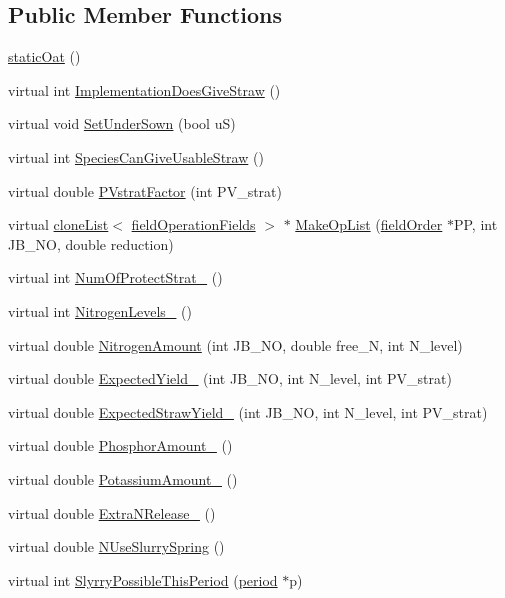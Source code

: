 \subsection*{Public Member Functions}
\begin{DoxyCompactItemize}
\item 
\hyperlink{classstatic_oat_afcf04a462cdd16c42cc6aad49eb2b06e}{staticOat} ()
\item 
virtual int \hyperlink{classstatic_oat_a75f86a415aa54352870606818273fd94}{ImplementationDoesGiveStraw} ()
\item 
virtual void \hyperlink{classstatic_oat_a6f91239da2b953258084806375b60516}{SetUnderSown} (bool uS)
\item 
virtual int \hyperlink{classstatic_oat_ab66ee7686d5a79a84ad38d01652910ac}{SpeciesCanGiveUsableStraw} ()
\item 
virtual double \hyperlink{classstatic_oat_af4d6207a79cfdb61327d060e5045078e}{PVstratFactor} (int PV\_\-strat)
\item 
virtual \hyperlink{classclone_list}{cloneList}$<$ \hyperlink{classfield_operation_fields}{fieldOperationFields} $>$ $\ast$ \hyperlink{classstatic_oat_a974ca1626880bafebc0c040c2ac2d84d}{MakeOpList} (\hyperlink{classfield_order}{fieldOrder} $\ast$PP, int JB\_\-NO, double reduction)
\item 
virtual int \hyperlink{classstatic_oat_a4f743cca9e48390571d709c2f8fbbb31}{NumOfProtectStrat\_\-} ()
\item 
virtual int \hyperlink{classstatic_oat_aea9ffb5d23d2bfe402b16172598e359b}{NitrogenLevels\_\-} ()
\item 
virtual double \hyperlink{classstatic_oat_a1f0a5175033091c837dea7ccb66dfef9}{NitrogenAmount} (int JB\_\-NO, double free\_\-N, int N\_\-level)
\item 
virtual double \hyperlink{classstatic_oat_a640e2c2320b000a47ea5ab306fa2cd2f}{ExpectedYield\_\-} (int JB\_\-NO, int N\_\-level, int PV\_\-strat)
\item 
virtual double \hyperlink{classstatic_oat_aec202e3df8d88cde3e5705d6569bdc9c}{ExpectedStrawYield\_\-} (int JB\_\-NO, int N\_\-level, int PV\_\-strat)
\item 
virtual double \hyperlink{classstatic_oat_a2cc3d18305c05a76da8163e80ced73b8}{PhosphorAmount\_\-} ()
\item 
virtual double \hyperlink{classstatic_oat_ac51205b35024c79cd19f50baf6bbb803}{PotassiumAmount\_\-} ()
\item 
virtual double \hyperlink{classstatic_oat_ae8bd647d11c451e57a4d195061520529}{ExtraNRelease\_\-} ()
\item 
virtual double \hyperlink{classstatic_oat_a85e86ff37c0620aaa290f77a7599271d}{NUseSlurrySpring} ()
\item 
virtual int \hyperlink{classstatic_oat_af1a87e97ec3a1521096e94b530bd4ac0}{SlyrryPossibleThisPeriod} (\hyperlink{classperiod}{period} $\ast$p)
\end{DoxyCompactItemize}
